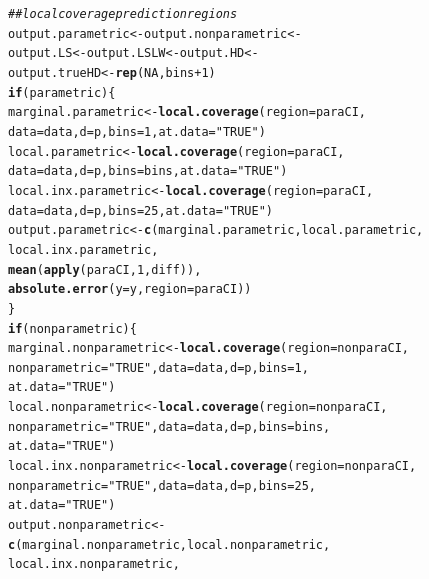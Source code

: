 \documentclass[11pt]{article}\usepackage[]{graphicx}\usepackage[]{color}
\makeatletter
\newcommand{\hlnum}[1]{\textcolor[rgb]{0.686,0.059,0.569}{#1}}%
\newcommand{\hlstr}[1]{\textcolor[rgb]{0.192,0.494,0.8}{#1}}%
\newcommand{\hlcom}[1]{\textcolor[rgb]{0.678,0.584,0.686}{\textit{#1}}}%
\newcommand{\hlopt}[1]{\textcolor[rgb]{0,0,0}{#1}}%
\newcommand{\hlstd}[1]{\textcolor[rgb]{0.345,0.345,0.345}{#1}}%
\newcommand{\hlkwa}[1]{\textcolor[rgb]{0.161,0.373,0.58}{\textbf{#1}}}%
\newcommand{\hlkwb}[1]{\textcolor[rgb]{0.69,0.353,0.396}{#1}}%
\newcommand{\hlkwc}[1]{\textcolor[rgb]{0.333,0.667,0.333}{#1}}%
\newcommand{\hlkwd}[1]{\textcolor[rgb]{0.737,0.353,0.396}{\textbf{#1}}}%
\newenvironment{kframe}{%
 \def\at@end@of@kframe{}%
 \ifinner\ifhmode%
  \def\at@end@of@kframe{\end{minipage}}%
  \begin{minipage}{\columnwidth}%
 \fi\fi%
 \def\FrameCommand##1{\hskip\@totalleftmargin \hskip-\fboxsep
 \colorbox{shadecolor}{##1}\hskip-\fboxsep
     \hskip-\linewidth \hskip-\@totalleftmargin \hskip\columnwidth}%
 \MakeFramed {\advance\hsize-\width
   \@totalleftmargin\z@ \linewidth\hsize
   \@setminipage}}%
 {\par\unskip\endMakeFramed%
 \at@end@of@kframe}
\newenvironment{knitrout}{}{} %
\makeatother
\begin{document}
\begin{knitrout}
\begin{kframe}
\begin{alltt}
  \hlcom{## local coverage prediction regions}
  \hlstd{output.parametric} \hlkwb{<-} \hlstd{output.nonparametric} \hlkwb{<-}
    \hlstd{output.LS} \hlkwb{<-} \hlstd{output.LSLW} \hlkwb{<-} \hlstd{output.HD} \hlkwb{<-}
    \hlstd{output.trueHD} \hlkwb{<-} \hlkwd{rep}\hlstd{(}\hlnum{NA}\hlstd{, bins} \hlopt{+} \hlnum{1}\hlstd{)}
  \hlkwa{if}\hlstd{(parametric)\{}
    \hlstd{marginal.parametric} \hlkwb{<-} \hlkwd{local.coverage}\hlstd{(}\hlkwc{region} \hlstd{= paraCI,}
      \hlkwc{data} \hlstd{= data,} \hlkwc{d} \hlstd{= p,} \hlkwc{bins} \hlstd{=} \hlnum{1}\hlstd{,} \hlkwc{at.data} \hlstd{=} \hlstr{"TRUE"}\hlstd{)}
    \hlstd{local.parametric} \hlkwb{<-} \hlkwd{local.coverage}\hlstd{(}\hlkwc{region} \hlstd{= paraCI,}
      \hlkwc{data} \hlstd{= data,} \hlkwc{d} \hlstd{= p,} \hlkwc{bins} \hlstd{= bins,} \hlkwc{at.data} \hlstd{=} \hlstr{"TRUE"}\hlstd{)}
    \hlstd{local.inx.parametric} \hlkwb{<-} \hlkwd{local.coverage}\hlstd{(}\hlkwc{region} \hlstd{= paraCI,}
      \hlkwc{data} \hlstd{= data,} \hlkwc{d} \hlstd{= p,} \hlkwc{bins} \hlstd{=} \hlnum{25}\hlstd{,} \hlkwc{at.data} \hlstd{=} \hlstr{"TRUE"}\hlstd{)}
    \hlstd{output.parametric} \hlkwb{<-} \hlkwd{c}\hlstd{(marginal.parametric, local.parametric,}
      \hlstd{local.inx.parametric,}
      \hlkwd{mean}\hlstd{(}\hlkwd{apply}\hlstd{(paraCI,} \hlnum{1}\hlstd{, diff)),}
      \hlkwd{absolute.error}\hlstd{(}\hlkwc{y} \hlstd{= y,} \hlkwc{region} \hlstd{= paraCI))}
  \hlstd{\}}
  \hlkwa{if}\hlstd{(nonparametric)\{}
    \hlstd{marginal.nonparametric} \hlkwb{<-} \hlkwd{local.coverage}\hlstd{(}\hlkwc{region} \hlstd{= nonparaCI,}
      \hlkwc{nonparametric} \hlstd{=} \hlstr{"TRUE"}\hlstd{,} \hlkwc{data} \hlstd{= data,} \hlkwc{d} \hlstd{= p,} \hlkwc{bins} \hlstd{=} \hlnum{1}\hlstd{,}
      \hlkwc{at.data} \hlstd{=} \hlstr{"TRUE"}\hlstd{)}
    \hlstd{local.nonparametric} \hlkwb{<-} \hlkwd{local.coverage}\hlstd{(}\hlkwc{region} \hlstd{= nonparaCI,}
      \hlkwc{nonparametric} \hlstd{=} \hlstr{"TRUE"}\hlstd{,} \hlkwc{data} \hlstd{= data,} \hlkwc{d} \hlstd{= p,} \hlkwc{bins} \hlstd{= bins,}
      \hlkwc{at.data} \hlstd{=} \hlstr{"TRUE"}\hlstd{)}
    \hlstd{local.inx.nonparametric} \hlkwb{<-} \hlkwd{local.coverage}\hlstd{(}\hlkwc{region} \hlstd{= nonparaCI,}
      \hlkwc{nonparametric} \hlstd{=} \hlstr{"TRUE"}\hlstd{,} \hlkwc{data} \hlstd{= data,} \hlkwc{d} \hlstd{= p,} \hlkwc{bins} \hlstd{=} \hlnum{25}\hlstd{,}
      \hlkwc{at.data} \hlstd{=} \hlstr{"TRUE"}\hlstd{)}
    \hlstd{output.nonparametric} \hlkwb{<-}
      \hlkwd{c}\hlstd{(marginal.nonparametric, local.nonparametric,}
        \hlstd{local.inx.nonparametric,}

\end{alltt}
\end{kframe}
\end{knitrout}
\end{document}
